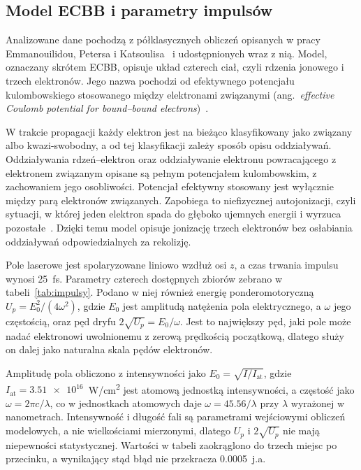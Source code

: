 \documentclass[12pt,a4paper]{article}
\newcommand{\ja}{j.a.}
\begin{document}
\subsection{Model ECBB i parametry impulsów}

Analizowane dane pochodzą z półklasycznych obliczeń opisanych w pracy
Emmanouilidou, Petersa i Katsoulisa~\cite{Emmanouilidou2023}
i udostępnionych wraz z nią. Model, oznaczany skrótem ECBB, opisuje
układ czterech ciał, czyli rdzenia jonowego i trzech elektronów. Jego
nazwa pochodzi od efektywnego potencjału kulombowskiego stosowanego
między elektronami związanymi (ang.~\emph{effective Coulomb potential
for bound--bound electrons})~\cite{Peters2022}.

W trakcie propagacji każdy elektron jest na bieżąco klasyfikowany jako
związany albo kwazi-swobodny, a od tej klasyfikacji zależy sposób opisu
oddziaływań. Oddziaływania rdzeń--elektron oraz oddziaływanie elektronu
powracającego z elektronem związanym opisane są pełnym potencjałem
kulombowskim, z zachowaniem jego osobliwości. Potencjał efektywny
stosowany jest wyłącznie między parą elektronów związanych. Zapobiega
to niefizycznej autojonizacji, czyli sytuacji, w której jeden elektron
spada do głęboko ujemnych energii i wyrzuca
pozostałe~\cite{Emmanouilidou2023,Peters2022}. Dzięki temu model opisuje
jonizację trzech elektronów bez osłabiania oddziaływań odpowiedzialnych
za rekolizję.

Pole laserowe jest spolaryzowane liniowo wzdłuż osi \(z\), a czas
trwania impulsu wynosi \num{25}~fs. Parametry czterech dostępnych
zbiorów zebrano w tabeli~\ref{tab:impulsy}. Podano w niej również
energię ponderomotoryczną \(U_p=E_0^2/(4\omega^2)\), gdzie \(E_0\) jest
amplitudą natężenia pola elektrycznego, a \(\omega\) jego częstością,
oraz pęd dryfu \(2\sqrt{U_p}=E_0/\omega\). Jest to największy pęd, jaki
pole może nadać elektronowi uwolnionemu z zerową prędkością początkową,
dlatego służy on dalej jako naturalna skala pędów elektronów.

Amplitudę pola obliczono z intensywności jako $E_0=\sqrt{I/I_{\mathrm{at}}}$,
gdzie $I_{\mathrm{at}}=\num{3.51e16}$~W/cm\textsuperscript{2} jest atomową
jednostką intensywności, a częstość jako $\omega=2\pi c/\lambda$, co
w jednostkach atomowych daje $\omega=\num{45.56}/\lambda$ przy $\lambda$
wyrażonej w nanometrach. Intensywność i długość fali są parametrami
wejściowymi obliczeń modelowych, a nie wielkościami mierzonymi, dlatego
$U_p$ i $2\sqrt{U_p}$ nie mają niepewności statystycznej. Wartości
w tabeli zaokrąglono do trzech miejsc po przecinku, a wynikający stąd
błąd nie przekracza \num{0.0005}~\ja
\end{document}
